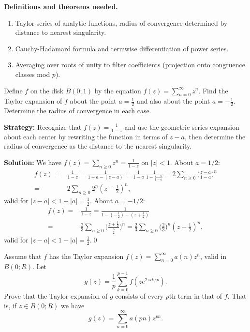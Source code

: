 \noindent\textbf{Definitions and theorems needed.}
\begin{enumerate}[label=(\alph*)]
\item Taylor series of analytic functions, radius of convergence determined by distance to nearest singularity.
\item Cauchy-Hadamard formula and termwise differentiation of power series.
\item Averaging over roots of unity to filter coefficients (projection onto congruence classes mod $p$).
\end{enumerate}



\begin{problembox}
Define \( f \) on the disk \( B(0; 1) \) by the equation \( f(z) = \sum_{n=0}^{\infty} z^n \). Find the Taylor expansion of \( f \) about the point \( a = \frac{1}{2} \) and also about the point \( a = -\frac{1}{2} \). Determine the radius of convergence in each case.
\end{problembox}

\noindent\textbf{Strategy:} Recognize that \( f(z) = \frac{1}{1-z} \) and use the geometric series expansion about each center by rewriting the function in terms of \( z-a \), then determine the radius of convergence as the distance to the nearest singularity.

\bigskip\noindent\textbf{Solution:}
We have $f(z)=\sum_{n\ge0}z^n=\frac{1}{1-z}$ on $|z|<1$. About $a=1/2$:
\begin{align*}
f(z)=&\frac{1}{1-z}=\frac{1}{1-a-(z-a)}=\frac{1}{1-a}\,\frac{1}{1-\frac{z-a}{1-a}}=2\sum_{n\ge0}\Big(\frac{z-a}{1-a}\Big)^n \\
=&2\sum_{n\ge0}2^n(z-\tfrac12)^n,
\end{align*}
valid for $|z-a|<1-|a|=\tfrac12$. About $a=-1/2$:
\begin{align*}
f(z)=&\frac{1}{1-z}=\frac{1}{1-(-\tfrac12)-(z+\tfrac12)}\\
=&\frac{2}{3}\sum_{n\ge0}\Big(\frac{z+\tfrac12}{\tfrac32}\Big)^n=\frac{2}{3}\sum_{n\ge0}\Big(\frac{2}{3}\Big)^n(z+\tfrac12)^n,
\end{align*}
valid for $|z-a|<1-|a|=\tfrac12$.\qed


\begin{problembox}
Assume that \( f \) has the Taylor expansion \( f(z) = \sum_{n=0}^{\infty} a(n)z^n \), valid in \( B(0; R) \). Let
\[g(z) = \frac{1}{p} \sum_{k=0}^{p-1} f(ze^{2\pi ik/p}).\]
Prove that the Taylor expansion of \( g \) consists of every \( p \)th term in that of \( f \). That is, if \( z \in B(0; R) \) we have
\[g(z) = \sum_{n=0}^{\infty} a(pn)z^{pn}.\]
\end{problembox}

